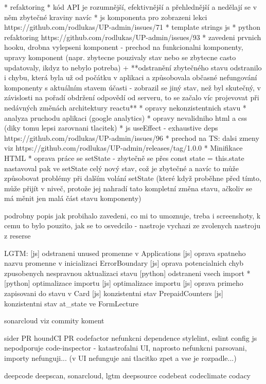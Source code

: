* refaktoring
* kód API je rozumnější, efektivnější a přehlednější a nedělají se v něm zbytečné kraviny navíc
* js komponenta pro zobrazeni lekci https://github.com/rodlukas/UP-admin/issues/71
* template strings js
* python refaktoring https://github.com/rodlukas/UP-admin/issues/93
* zavedeni prvnich hooku, drobna vylepseni komponent - prechod na funkcionalni komponenty, upravy komponent (napr. zbytecne pouzivaly stav nebo se zbytecne casto updatovaly, ikdyz to nebylo potreba) + **odstranění zbytečného stavu odstranilo i chybu, která byla už od počátku v aplikaci a způsobovala občasné nefungování komponenty s aktuálním stavem účasti - zobrazil se jiný stav, než byl skutečný, v závislosti na pořadí obdržení odpovědí od serveru, to se začalo víc projevovat při nedávných změnách architektury reactu**
* opravy nekonzistentnich stavu
* analyza pruchodu aplikaci (google analytics)
* opravy nevalidniho html a css (diky tomu lepsi zarovnani tlacitek)
*  js useEffect - exhaustive deps https://github.com/rodlukas/UP-admin/issues/96
* prechod na TS: dalsi zmeny viz https://github.com/rodlukas/UP-admin/releases/tag/1.0.0
* Minifikace HTML
* oprava práce se setState - zbytečně se přes const state = this.state nastavoval pak ve setState celý nový stav, což je zbytečné a navíc to může způsobovat problémy při dalším volání setState (které když proběhne před tímto, může přijít v niveč, protože jej nahradí tato kompletní změna stavu, ačkoliv se má měnit jen malá část stavu komponenty) 



podrobny popis jak probihalo zavedeni, co mi to umoznuje, treba i screenshoty, k cemu to bylo pouzito, jak se to osvedcilo - nastroje vychazi ze zvolenych nastroju z reserse


LGTM: 
[js] odstraneni unused promenne v Applications
[js] oprava spatneho nazvu promenne v inicializaci ErrorBoundary
[js] oprava potencialnich chyb zpusobenych nespravnou aktualizaci stavu
[python] odstraneni vsech import *
[python] optimalizace importu
[js] optimalizace importu
[js] oprava primeho zapisovani do stavu v Card
[js] konzistentni stav PrepaidCounters
[js] konzistentni stav at\_state ve FormLecture

sonarcloud viz commity koment


sider PR
houndCI PR
codefactor nefunkcni dependence stylelint, eslint config js nepodporuje
code-inspector - katastrofalni UI, naprosto nefunkcni parsovani, importy nefunguji... (v UI nefunguje ani tlacitko zpet a vse je rozpadle...)


deepcode
deepscan, sonarcloud, lgtm
deepsource
codebeat
codeclimate
codacy


